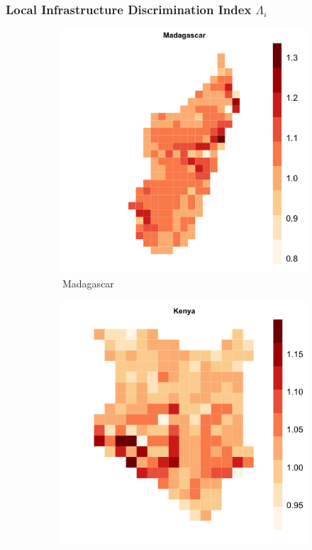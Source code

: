 \documentclass[]{beamer}   	%
\begin{document}
\begin{frame}
  \frametitle{Local Infrastructure Discrimination Index $\Lambda_{i}$}
\begin{figure}
\caption{$\Lambda_{i}$ for sample countries}
\begin{subfigure}[c]{0.32\textwidth}
\includegraphics[width=\textwidth]{../../Analysis/output/zeta_heatmaps/Madagascar_zeta.png}
\caption{Madagascar}
\label{fig:Madagascar_zeta}
\end{subfigure}
\begin{subfigure}[c]{0.32\textwidth}
\includegraphics[width=\textwidth]{../../Analysis/output/zeta_heatmaps/Kenya_zeta.png}

\end{subfigure}
\end{figure}
\end{frame}
\end{document}
